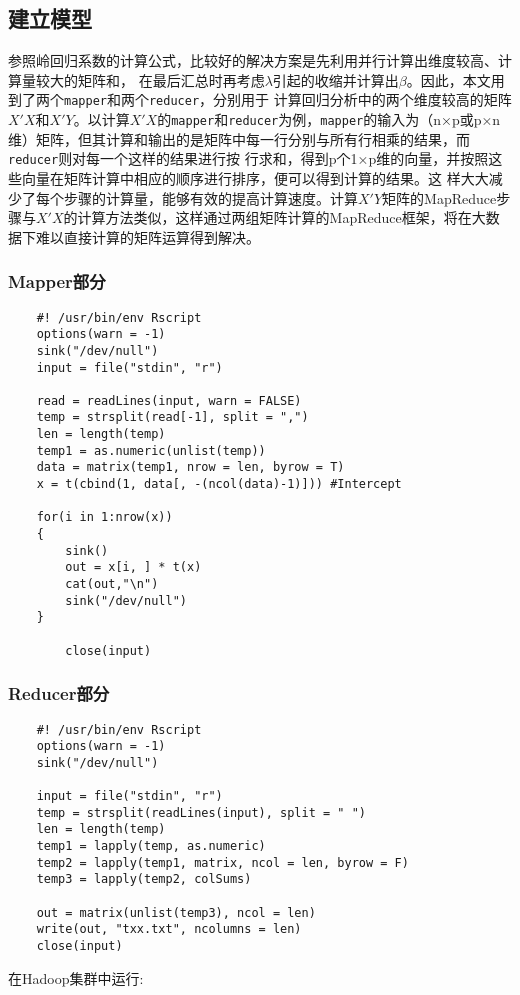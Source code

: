 \subsection{建立模型}\label{ux5efaux7acbux6a21ux578b}

参照岭回归系数的计算公式，比较好的解决方案是先利用并行计算出维度较高、计算量较大的矩阵和，
在最后汇总时再考虑$\lambda$引起的收缩并计算出$\beta$。因此，本文用到了两个\lstinline|mapper|和两个\lstinline|reducer|，分别用于
计算回归分析中的两个维度较高的矩阵$X'X$和$X'Y$。以计算$X'X$的\lstinline|mapper|和\lstinline|reducer|为例，\lstinline|mapper|的输入为（n×p或p×n
维）矩阵，但其计算和输出的是矩阵中每一行分别与所有行相乘的结果，而\lstinline|reducer|则对每一个这样的结果进行按
行求和，得到p个1×p维的向量，并按照这些向量在矩阵计算中相应的顺序进行排序，便可以得到计算的结果。这
样大大减少了每个步骤的计算量，能够有效的提高计算速度。计算$X'Y$矩阵的MapReduce步骤与$X'X$的计算方法类似，这样通过两组矩阵计算的MapReduce框架，将在大数据下难以直接计算的矩阵运算得到解决。

\subsubsection{Mapper部分}\label{mapperux90e8ux5206}

\begin{lstlisting}
	#! /usr/bin/env Rscript
	options(warn = -1)
	sink("/dev/null")
	input = file("stdin", "r")

	read = readLines(input, warn = FALSE)
	temp = strsplit(read[-1], split = ",")
	len = length(temp)
	temp1 = as.numeric(unlist(temp))
	data = matrix(temp1, nrow = len, byrow = T)
	x = t(cbind(1, data[, -(ncol(data)-1)])) #Intercept

	for(i in 1:nrow(x))
	{
	    sink()
	    out = x[i, ] * t(x)
	    cat(out,"\n")
	    sink("/dev/null")
	}

		close(input)
\end{lstlisting}

\subsubsection{Reducer部分}\label{reducerux90e8ux5206}

\begin{lstlisting}
	#! /usr/bin/env Rscript
	options(warn = -1)
	sink("/dev/null")

	input = file("stdin", "r")
	temp = strsplit(readLines(input), split = " ")
	len = length(temp)
	temp1 = lapply(temp, as.numeric)
	temp2 = lapply(temp1, matrix, ncol = len, byrow = F)
	temp3 = lapply(temp2, colSums)

	out = matrix(unlist(temp3), ncol = len)
	write(out, "txx.txt", ncolumns = len)
	close(input)
\end{lstlisting}
在Hadoop集群中运行:

